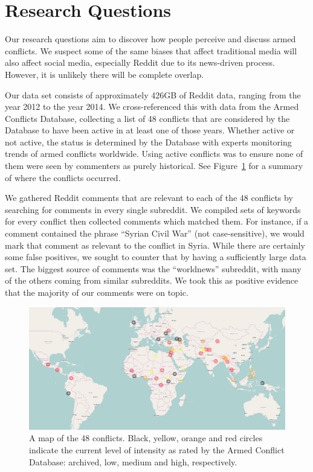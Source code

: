 \section{Research Questions}
Our research questions aim to discover how people perceive and discuss armed conflicts. We suspect some of the same biases that affect traditional media will also affect social media, especially Reddit due to its news-driven process. However, it is unlikely there will be complete overlap.

Our data set consists of approximately 426GB of Reddit data, ranging from the year 2012 to the year 2014. We cross-referenced this with data from the Armed Conflicts Database, collecting a list of 48 conflicts that are considered by the Database to have been active in at least one of those years. Whether active or not active, the status is determined by the Database with experts monitoring trends of armed conflicts worldwide. Using active conflicts was to ensure none of them were seen by commenters as purely historical. See Figure~\ref{conflicts} for a summary of where the conflicts occurred. 

We gathered Reddit comments that are relevant to each of the 48 conflicts by searching for comments in every single subreddit. We compiled sets of keywords for every conflict then collected comments which matched them. For instance, if a comment contained the phrase ``Syrian Civil War'' (not case-sensitive), we would mark that comment as relevant to the conflict in Syria. While there are certainly some false positives, we sought to counter that by having a sufficiently large data set. The biggest source of comments was the ``worldnews'' subreddit, with many of the others coming from similar subreddits. We took this as positive evidence that the majority of our comments were on topic. 

\begin{figure}
\centering
\includegraphics[width=0.9\columnwidth]{map}
\caption{A map of the 48 conflicts. Black, yellow, orange and red circles indicate the current level of intensity as rated by the Armed Conflict Database: archived, low, medium and high, respectively.}
\label{conflicts}
\end{figure}